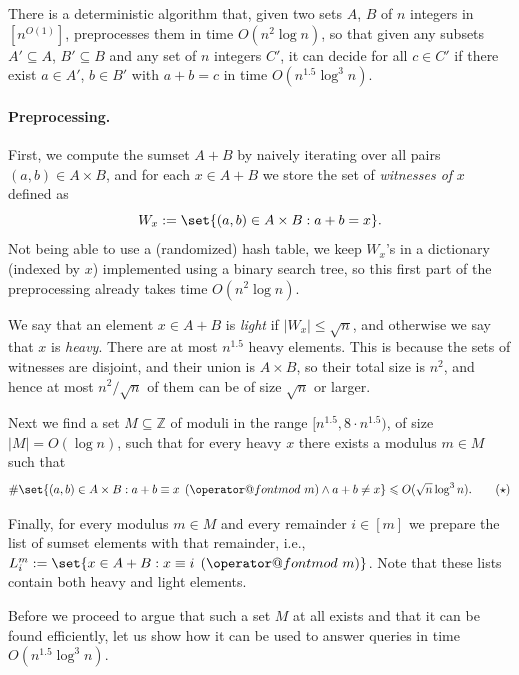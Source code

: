 \documentclass{theoretics}
\makeatletter
\newcommand{\tpmod}[1]{\mkern 8mu({\operator@font mod}\mkern 6mu#1)}
\makeatother
\begin{document}
\begin{theorem}\label{thm:unknowncdet}
    There is a deterministic algorithm that, given two sets $A$, $B$ of $n$ integers in $[n^{O(1)}]$, preprocesses them in time $O(n^2 \log n)$, so that given any subsets $A' \subseteq A$, $B' \subseteq B$ and any set of $n$ integers $C'$, it can decide for all $c \in C'$ if there exist $a \in A'$, $b \in B'$ with $a+b=c$ in time $O(n^{1.5} \log^3 n)$.
\end{theorem}

\paragraph{Preprocessing.}

First, we compute the sumset $A+B$ by naively iterating over all pairs $(a,b) \in A \times B$, and for each $x \in A+B$ we store the set of \emph{witnesses of} $x$ defined as
\[W_x := \set{ (a, b) \in A \times B : a + b = x}.\]
Not being able to use a (randomized) hash table, we keep $W_x$'s in a dictionary (indexed by $x$) implemented using a binary search tree, so this first part of the preprocessing already takes time $O(n^2 \log n)$.

We say that an element $x \in A+B$ is \emph{light} if $|W_x| \leqslant \sqrt{n}$, and otherwise we say that $x$ is \emph{heavy}. There are at most $n^{1.5}$ heavy elements.
This is because the sets of witnesses are disjoint, and their union is $A \times B$, so their total size is $n^2$, and hence at most $n^2/\sqrt{n}$ of them can be of size $\sqrt{n}$ or larger.

Next we find a set $M \subseteq \mathbb{Z}$ of moduli in the range $[n^{1.5}, 8 \cdot n^{1.5})$, of size $|M|=O(\log n)$, such that for every heavy $x$ there exists a modulus $m \in M$ such that
\[\#\set{(a,b) \in A \times B : a + b \equiv x \tpmod{m} \land a+b \neq x} \leqslant O(\sqrt{n} \log^3 n). \tag{$\star$}\]

Finally, for every modulus $m \in M$ and every remainder $i \in [m]$ we prepare the list of sumset elements with that remainder, i.e., $L^m_i := \set{x \in A+B : x \equiv i \tpmod{m}}$. Note that these lists contain both heavy and light elements.

Before we proceed to argue that such a set $M$ at all exists and that it can be found efficiently, let us show how it can be used to answer queries in time $O(n^{1.5} \log^3 n)$.
\end{document}
